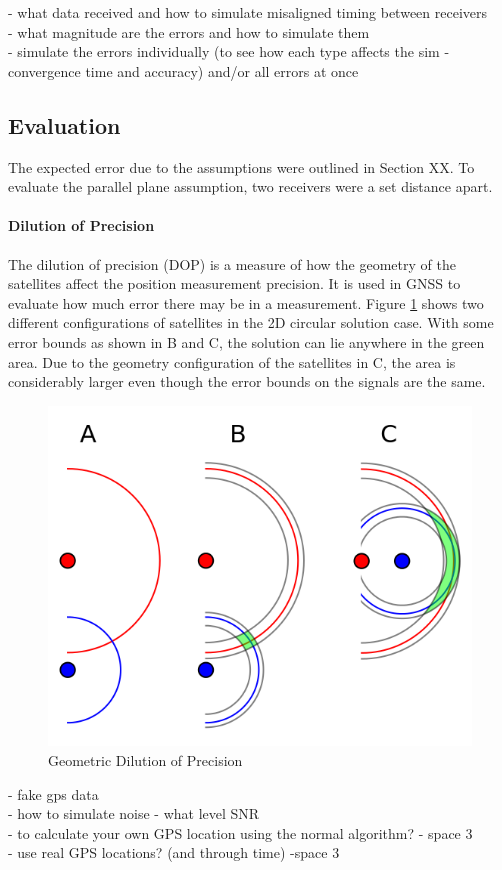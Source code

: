 - what data received and how to simulate misaligned timing between receivers\\
- what magnitude are the errors and how to simulate them\\
- simulate the errors individually (to see how each type affects the sim - convergence time and accuracy) and/or all errors at once


\subsection{Evaluation} %
The expected error due to the assumptions were outlined in Section XX. To evaluate the parallel plane assumption, two receivers were a set distance apart.


\paragraph{Dilution of Precision}
The dilution of precision (DOP) is a measure of how the geometry of the satellites affect the position measurement precision. It is used in GNSS to evaluate how much error there may be in a measurement. Figure \ref{Fig: GDOP abstract} shows two different configurations of satellites in the 2D circular solution case. With some error bounds as shown in B and C, the solution can lie anywhere in the green area. Due to the geometry configuration of the satellites in C, the area is considerably larger even though the error bounds on the signals are the same.

\begin{figure}
\centering
\caption{Geometric Dilution of Precision}
\label{Fig: GDOP abstract}
\includegraphics[width=0.7\linewidth]{ChapterExperiments/Figures/GDOP.png}
\end{figure}




- fake gps data\\
- how to simulate noise - what level SNR\\
- to calculate your own GPS location using the normal algorithm? - space 3 \\
- use real GPS locations? (and through time) -space 3\\


